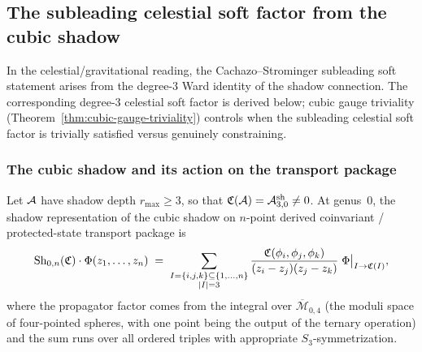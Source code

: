 %
%

\subsection{The subleading celestial soft factor from the cubic shadow}
\label{subsec:thqg-VI-subleading-soft}

In the celestial/gravitational reading, the Cachazo--Strominger
subleading soft statement arises from the degree-$3$ Ward
identity of the shadow connection. The
corresponding degree-$3$ celestial soft factor is derived below; cubic gauge triviality
(Theorem~\ref{thm:cubic-gauge-triviality}) controls when the
subleading celestial soft factor is trivially satisfied versus
genuinely constraining.

\subsubsection{The cubic shadow and its action on the transport package}

\begin{proposition}
Let $\mathcal{A}$ have shadow depth $r_{\max} \geq 3$, so that
$\mathfrak{C}(\mathcal{A}) = \mathcal{A}^{\mathrm{sh}}_{3,0} \neq 0$.
At genus~$0$, the shadow representation of the cubic shadow on
$n$-point derived coinvariant / protected-state transport package is
\begin{equation}%
\Sh_{0,n}(\mathfrak{C}) \cdot \Phi(z_1, \dotsc, z_n)
\;=\;
\sum_{\substack{I = \{i,j,k\} \subseteq \{1,\dotsc,n\} \\
 |I| = 3}}
\frac{\mathfrak{C}(\phi_i, \phi_j, \phi_k)}
 {(z_i - z_j)(z_j - z_k)}\;
\Phi\bigl|_{I \to \mathfrak{C}(I)},
\end{equation}
where the propagator factor comes from the integral over
$\overline{\mathcal{M}}_{0,4}$ (the moduli space of four-pointed
spheres, with one point being the output of the ternary operation)
and the sum runs over all ordered triples with appropriate
$S_3$-symmetrization.
\end{proposition}

